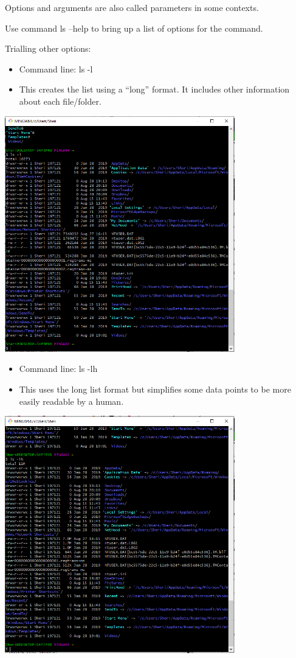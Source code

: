 \documentclass{article}
\begin{document}
Options and arguments are also called parameters in some contexts.

Use command ls --help to bring up a list of options for the command. 

Trialling other options:
\begin{itemize}
    \item Command line: ls -l
    \item This creates the list using a ``long'' format. It includes other information about each file/folder.
\end{itemize}

\includegraphics[width=10cm]{Images/GitBash_005.PNG}

\begin{itemize}
    \item Command line: ls -lh
    \item This uses the long list format but simplifies some data points to be more easily readable by a human. 
\end{itemize}

\includegraphics[width=10cm]{Images/GitBash_006.PNG}
\end{document}
